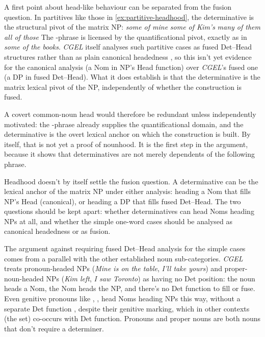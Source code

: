 \documentclass[12pt]{article}
\begin{document}
A first point about head-like behaviour can be separated from the fusion question. In partitives like those in \ref{ex:partitive-headhood}, the determinative is the structural pivot of the matrix NP:
\ea\label{ex:partitive-headhood}
\ea \textit{some of mine}
\ex \textit{some of Kim's}
\ex \textit{many of them}
\ex \textit{all of those}
\z
\z
The -phrase is licensed by the quantificational pivot, exactly as in \textit{some of the books}. \textit{CGEL} itself analyses such partitive cases as fused Det--Head structures rather than as plain canonical headedness \citep[Ch.~5 §9]{huddleston2002}, so this isn't yet evidence for the canonical analysis (a Nom in NP's Head function) over \textit{CGEL}'s fused one (a DP in fused Det--Head). What it does establish is that the determinative is the matrix lexical pivot of the NP, independently of whether the construction is fused.

A covert common-noun head would therefore be redundant unless independently motivated: the -phrase already supplies the quantificational domain, and the determinative is the overt lexical anchor on which the construction is built. By itself, that is not yet a proof of nounhood. It is the first step in the argument, because it shows that determinatives are not merely dependents of the following phrase.

Headhood doesn't by itself settle the fusion question. A determinative can be the lexical anchor of the matrix NP under either analysis: heading a Nom that fills NP's Head (canonical), or heading a DP that fills fused Det--Head. The two questions should be kept apart: whether determinatives can head Noms heading NPs at all, and whether the simple one-word cases should be analysed as canonical headedness or as fusion.

The argument against requiring fused Det--Head analysis for the simple cases comes from a parallel with the other established noun sub-categories. \textit{CGEL} treats pronoun-headed NPs (\textit{Mine is on the table}, \textit{I'll take yours}) and proper-noun-headed NPs (\textit{Kim left}, \textit{I saw Toronto}) as having no Det position: the noun heads a Nom, the Nom heads the NP, and there's no Det function to fill or fuse. Even genitive pronouns like , ,  head Noms heading NPs this way, without a separate Det function \citep[411]{huddleston2002}, despite their genitive marking, which in other contexts (the  set) co-occurs with Det function. Pronouns and proper nouns are both nouns that don't require a determiner.
\end{document}
